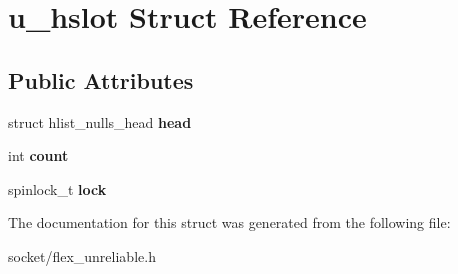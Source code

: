 \hypertarget{structu__hslot}{}\section{u\+\_\+hslot Struct Reference}
\label{structu__hslot}
\subsection*{Public Attributes}
\begin{DoxyCompactItemize}
\item 
struct hlist\+\_\+nulls\+\_\+head {\bfseries head}\hypertarget{structu__hslot_abe6060ce741ff9e94d6f4669ec7f4c9a}{}\label{structu__hslot_abe6060ce741ff9e94d6f4669ec7f4c9a}

\item 
int {\bfseries count}\hypertarget{structu__hslot_a2eee707762aa72c4d82f24d0422efa19}{}\label{structu__hslot_a2eee707762aa72c4d82f24d0422efa19}

\item 
spinlock\+\_\+t {\bfseries lock}\hypertarget{structu__hslot_a3a866b196889821639c6d1aa91af6154}{}\label{structu__hslot_a3a866b196889821639c6d1aa91af6154}

\end{DoxyCompactItemize}


The documentation for this struct was generated from the following file\+:\begin{DoxyCompactItemize}
\item 
socket/flex\+\_\+unreliable.\+h\end{DoxyCompactItemize}
